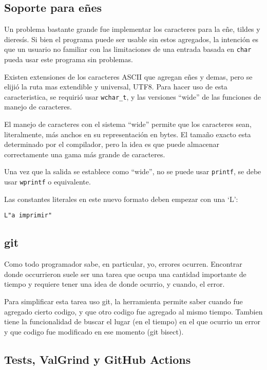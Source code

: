 \documentclass{article}
\begin{document}
	\subsection*{Soporte para eñes}
	
	Un problema bastante grande fue implementar los caracteres para la eñe, tildes y dieresís. Si bien el programa puede ser usable sin estos agregados, la intención es que un usuario no familiar con las limitaciones de una entrada basada en \verb|char| pueda usar este programa sin problemas.
	
	Existen extensiones de los caracteres ASCII que agregan eñes y demas, pero se elijió la ruta mas extendible y universal, UTF8. Para hacer uso de esta caracteristica, se requirió usar \verb|wchar_t|, y las versiones ``wide'' de las funciones de manejo de caracteres. 
	
	El manejo de caracteres con el sistema ``wide'' permite que los caracteres sean, literalmente, más anchos en su representación en bytes. El tamaño exacto esta determinado por el compilador, pero la idea es que puede almacenar correctamente una gama más grande de caracteres.
	
	Una vez que la salida se establece como ``wide'', no se puede usar \verb|printf|, se debe usar \verb|wprintf| o equivalente.
	
	Las constantes literales en este nuevo formato deben empezar con una `L':
	
	\verb|L"a imprimir"|
	
	\subsection*{git}
	
	Como todo programador sabe, en particular, yo, errores ocurren. Encontrar donde occurrieron suele ser una tarea que ocupa una cantidad importante de tiempo y requiere tener una idea de donde ocurrio, y cuando, el error. 
	
	Para simplificar esta tarea uso git, la herramienta permite saber cuando fue agregado cierto codigo, y que otro codigo fue agregado al mismo tiempo. Tambien tiene la funcionalidad de buscar el lugar (en el tiempo) en el que ocurrio un error y que codigo fue modificado en ese momento (git bisect).
	
	\subsection*{Tests, ValGrind y GitHub Actions}
\end{document}
